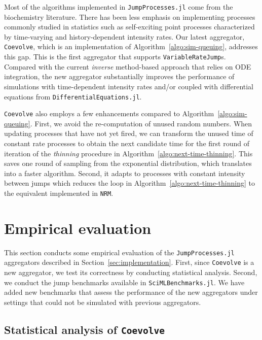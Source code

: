 \documentclass{juliacon}
\numberwithin{equation}{section}
\begin{document}
Most of the algorithms implemented in \texttt{JumpProcesses.jl} come from the biochemistry literature. There has been less emphasis on implementing processes commonly studied in statistics such as self-exciting point processes characterized by time-varying and history-dependent intensity rates. Our latest aggregator, \texttt{Coevolve}, which is an implementation of Algorithm~\ref{algo:sim-queuing}, addresses this gap. This is the first aggregator that supports \texttt{VariableRateJump}s. Compared with the current \textit{inverse} method-based approach that relies on ODE integration, the new aggregator substantially improves the performance of simulations with time-dependent intensity rates and/or coupled with differential equations from \texttt{DifferentialEquations.jl}.

\texttt{Coevolve} also employs a few enhancements compared to Algorithm~\ref{algo:sim-queuing}. First, we avoid the re-computation of unused random numbers. When updating processes that have not yet fired, we can transform the unused time of constant rate processes to obtain the next candidate time for the first round of iteration of the \textit{thinning} procedure in Algorithm~\ref{algo:next-time-thinning}. This saves one round of sampling from the exponential distribution, which translates into a faster algorithm. Second, it adapts to processes with constant intensity between jumps which reduces the loop in Algorithm~\ref{algo:next-time-thinning} to the equivalent implemented in \texttt{NRM}.

\section{Empirical evaluation} \label{sec:evaluation}

This section conducts some empirical evaluation of the \texttt{JumpProcesses.jl} aggregators described in Section~\ref{sec:implementation}. First, since \texttt{Coevolve} is a new aggregator, we test its correctness by conducting statistical analysis. Second, we conduct the jump benchmarks available in  \texttt{SciMLBenchmarks.jl}. We have added new benchmarks that assess the performance of the new aggregators under settings that could not be simulated with previous aggregators.

\subsection{Statistical analysis of \texttt{Coevolve}}
\end{document}
